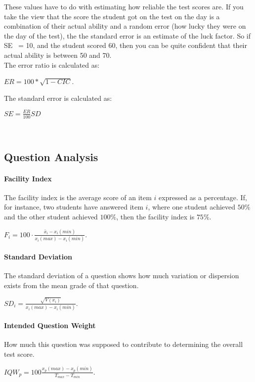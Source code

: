 \documentclass[12pt]{report}
\begin{document}
These values have to do with estimating how reliable the test scores are.
If you take the view that the score the student got on the test on the day is a combination
 of their actual ability and a random error
  (how lucky they were on the day of the test),
   the the standard error is an estimate of the luck factor. So if SE ~= 10, and the student scored 60, then you can be quite confident
    that their actual ability is between 50 and 70.\\

The error ratio is calculated as:

$ER=100*\sqrt{1-{CIC}}$.

The standard error is calculated as:

$SE=\frac{ER}{100}SD$

\ \\

\subsection{Question Analysis}
\label{subsubsec:questions}

\paragraph{Facility Index}
The facility index is the average score of an item $i$ expressed as a percentage. If, for instance, two students have answered item $i$, where one student achieved $50\%$ and the other student achieved $100\%$, then the facility index is $75\%$.

$F_i = 100\cdot\frac{\bar{x}_i - x_i(min)}{x_i(max) - x_i(min)}$. 

\paragraph{Standard Deviation}
The standard deviation of a question shows how much variation or dispersion exists from the mean grade of that question. 

$SD_i = \frac{\sqrt{V(x_i)}}{x_i(max) - x_i(min)}$.

\paragraph{Intended Question Weight}

How much this question was supposed to contribute to determining the overall test score.

$IQW_p = 100\frac{x_p(max) - x_p(min)}{T_{max} - T_{min}}$.\\
\end{document}
